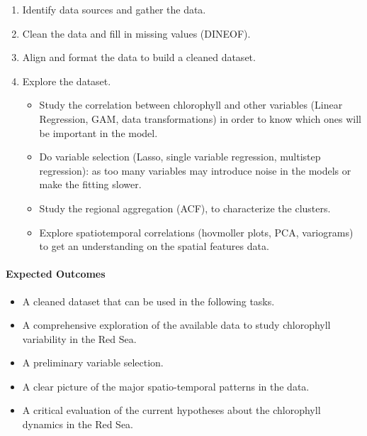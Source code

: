 \begin{enumerate} 

\item Identify data sources and gather the data.

\item Clean the data and fill in missing values (DINEOF).

\item Align and format the data to build a cleaned dataset.

\item Explore the dataset.

\begin{itemize} 

\item Study the correlation between chlorophyll and other variables (Linear
Regression, GAM, data transformations) in order to know which ones will
be important in the model.

\item Do variable selection (Lasso, single variable regression, multistep
regression): as too many variables may introduce noise in the models or make
the fitting slower.

\item Study the regional aggregation (ACF), to characterize the 
clusters.

\item Explore spatiotemporal correlations (hovmoller plots, PCA, variograms)
to get an understanding on the spatial features data.

\end{itemize}

\end{enumerate}

\paragraph{Expected Outcomes}

\begin{itemize} 

\item A cleaned dataset that can be used in the following tasks.

\item A comprehensive exploration of the available data to study chlorophyll
variability in the Red Sea.

\item A preliminary variable selection.

\item A clear picture of the major spatio-temporal patterns in the data.

\item A critical evaluation of the current hypotheses about the chlorophyll
dynamics in the Red Sea.

\end{itemize}

